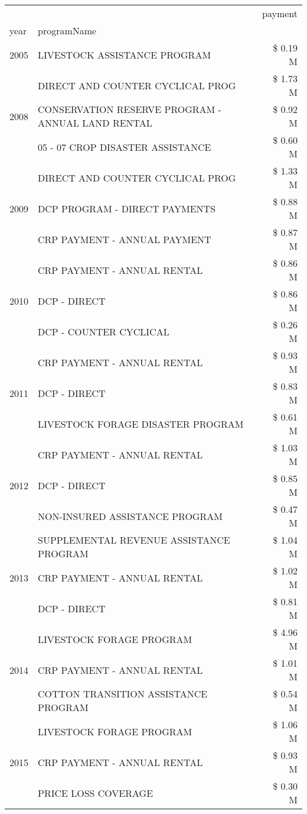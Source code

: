\begin{tabular}{llr}
\toprule
 &  & payment \\
year & programName &  \\
\midrule
2005 & LIVESTOCK ASSISTANCE PROGRAM & \$ 0.19 M \\
\cline{1-3}
\multirow[t]{3}{*}{2008} & DIRECT AND COUNTER CYCLICAL PROG & \$ 1.73 M \\
 & CONSERVATION RESERVE PROGRAM - ANNUAL LAND RENTAL & \$ 0.92 M \\
 & 05 - 07 CROP DISASTER ASSISTANCE & \$ 0.60 M \\
\cline{1-3}
\multirow[t]{3}{*}{2009} & DIRECT AND COUNTER CYCLICAL PROG & \$ 1.33 M \\
 & DCP PROGRAM - DIRECT PAYMENTS & \$ 0.88 M \\
 & CRP PAYMENT - ANNUAL PAYMENT & \$ 0.87 M \\
\cline{1-3}
\multirow[t]{3}{*}{2010} & CRP PAYMENT - ANNUAL RENTAL & \$ 0.86 M \\
 & DCP - DIRECT & \$ 0.86 M \\
 & DCP - COUNTER CYCLICAL & \$ 0.26 M \\
\cline{1-3}
\multirow[t]{3}{*}{2011} & CRP PAYMENT - ANNUAL RENTAL & \$ 0.93 M \\
 & DCP - DIRECT & \$ 0.83 M \\
 & LIVESTOCK FORAGE DISASTER PROGRAM & \$ 0.61 M \\
\cline{1-3}
\multirow[t]{3}{*}{2012} & CRP PAYMENT - ANNUAL RENTAL & \$ 1.03 M \\
 & DCP - DIRECT & \$ 0.85 M \\
 & NON-INSURED ASSISTANCE PROGRAM & \$ 0.47 M \\
\cline{1-3}
\multirow[t]{3}{*}{2013} & SUPPLEMENTAL REVENUE ASSISTANCE PROGRAM & \$ 1.04 M \\
 & CRP PAYMENT - ANNUAL RENTAL & \$ 1.02 M \\
 & DCP - DIRECT & \$ 0.81 M \\
\cline{1-3}
\multirow[t]{3}{*}{2014} & LIVESTOCK FORAGE PROGRAM & \$ 4.96 M \\
 & CRP PAYMENT - ANNUAL RENTAL & \$ 1.01 M \\
 & COTTON TRANSITION ASSISTANCE PROGRAM & \$ 0.54 M \\
\cline{1-3}
\multirow[t]{3}{*}{2015} & LIVESTOCK FORAGE PROGRAM & \$ 1.06 M \\
 & CRP PAYMENT - ANNUAL RENTAL & \$ 0.93 M \\
 & PRICE LOSS COVERAGE & \$ 0.30 M \\

\end{tabular}

